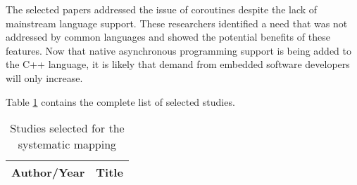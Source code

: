 The selected papers addressed the issue of coroutines despite the lack of mainstream language support. These researchers identified a need that was not addressed by common languages and showed the potential benefits of these features. Now that native asynchronous programming support is being added to the C++ language, it is likely that demand from embedded software developers will only increase. 

\iffalse 
Table \ref{dataset} contains the complete list of selected studies.

\begin{longtable}[c]{ l p{8cm} } 
	\caption{Studies selected for the systematic mapping
	\label{dataset}}\\
	\hline
	
Author/Year & Title \\ \hline
\endhead


\end{longtable}
